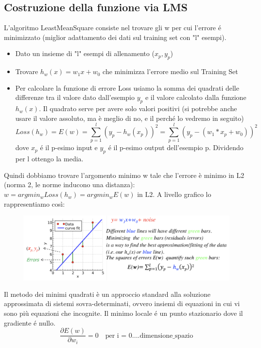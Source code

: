 \documentclass{article}
\begin{document}
\subsection{Costruzione della funzione via LMS}
L'algoritmo LeastMeanSquare consiste nel trovare gli w per cui l'errore é minimizzato (miglior adattamento dei dati sul training set con "l" esempi).
\begin{itemize}
    \item Dato un insieme di "l" esempi di allenamento ($x_p,y_p$)
    \item Trovare $h_w(x)=w_1x+w_0$ che minimizza l'errore medio sul Training Set
    \item Per calcolare la funzione di errore Loss usiamo la somma dei quadrati delle differenze tra il valore dato dall'esempio $y_p$ e il valore calcolato dalla funzione $h_w(x)$. Il quadrato serve per avere solo valori positivi (si potrebbe anche usare il valore assoluto, ma è meglio di no, e il perché lo vedremo in seguito)
    \begin{equation}
        Loss(h_w) = E(w) = \sum_{p = 1}^l (y_p - h_w(x_p))^2 = \sum_{p = 1}^l (y_p - (w_1*x_p + w_0))^2
    \end{equation} 
    dove $x_p$ é il p-esimo input e $y_p$ é il p-esimo output dell'esempio p. Dividendo per l ottengo la media.
\end{itemize}
Quindi dobbiamo trovare l'argomento minimo w tale che l'errore è minimo in L2 (norma 2, le norme inducono una distanza): $w = argmin_wLoss(h_w) = argmin_wE(w) \text{ in L2}$. A livello grafico lo rappresentiamo così: 
\begin{figure}[H]
    \centering
    \includegraphics[scale=0.5]{Images/lmsgrafico.png}
\end{figure}
Il metodo dei minimi quadrati è un approccio standard alla soluzione approssimata di sistemi sovra-determinati, ovvero insiemi di equazioni in cui vi sono più equazioni che incognite. \newline
Il minimo locale é un punto stazionario dove il gradiente é nullo.
\begin{equation}
    \frac{\partial E(w)}{\partial w_i} = 0 \quad \text{per i = 0....dimensione\_spazio}
\end{equation}
\end{document}
